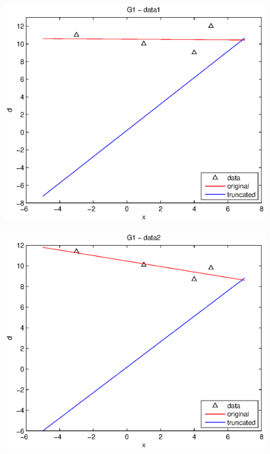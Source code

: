 \documentclass[11pt]{article}
\begin{document}
\begin{figure}
\begin{center}
  \includegraphics[width=12cm]{p2fig1.eps}
  \end{center}
\end{figure}
\begin{figure}
\begin{center}
  \includegraphics[width=12cm]{p2fig2.eps}
  \end{center}
\end{figure}
\end{document}
